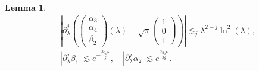 \documentclass[11 pt]{amsart}
\newtheorem{lem}{Lemma}[section]
\theoremstyle{definition}
\theoremstyle{remark}
\numberwithin{equation}{section}
\begin{document}
\begin{lem}
  \begin{align}
\label{estimate-parameters-matching-low-1}&     \left| \partial_{\lambda}^j \left( \left(\begin{array}{c}
       \alpha_3\\
       \alpha_4\\
       \beta_2
     \end{array}\right) (\lambda) - \sqrt{\pi}
     \left(\begin{array}{c}
       1\\
       0\\
       1
     \end{array}\right) \right) \right| \lesssim_j \lambda^{2 - j} \ln^2
     (\lambda),\\
\label{estimate-parameters-matching-low-2}     & |\partial_\lambda^j  \beta_1|\lesssim e^{-\frac{3 y_0\kappa}{\xi}}, \quad |\partial_\lambda^j  \alpha_2|\lesssim e^{\frac{2 y_0\kappa}{3\xi}}.
     \end{align}
\end{lem}
\end{document}
